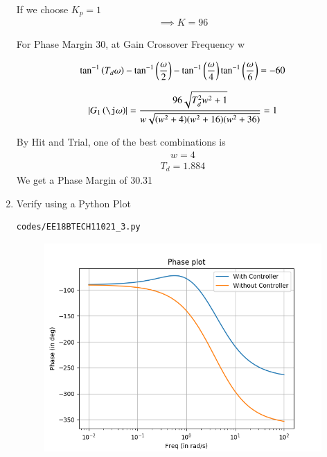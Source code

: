 \begin{enumerate}[label=\thesection.\arabic*.,ref=\thesection.\theenumi]
If we choose $K_{p} = 1$
\begin{align}
    \implies K = 96
\end{align}

For Phase Margin 30\degree, at Gain Crossover Frequency w

\begin{align}
    \tan^{-1}\left(T_{d}\omega\right) - \tan^{-1}\left(\frac{\omega}{2}\right) - \tan^{-1}\left(\frac{\omega}{4}\right)
    \tan^{-1}\left(\frac{\omega}{6}\right) = -60
\end{align}

\begin{align}
    \abs{G_{1}\brak{\j\omega}} = \frac{96\sqrt{T_{d}^2w^2 + 1}}{w\sqrt{(w^2+4)(w^2 + 16)(w^2 + 36)}} = 1
\end{align}

By Hit and Trial, one of the best combinations is
\begin{align}
    w = 4
\end{align}
\begin{align}
    T_{d} = 1.884
\end{align}
We get a Phase Margin of 30.31\degree

\item
Verify using a Python Plot

\solution
\begin{lstlisting}
codes/EE18BTECH11021_3.py
\end{lstlisting}

\begin{figure}
\centering
\includegraphics[width=\columnwidth]{figs/EE18BTECH11021_PD.png}
\end{figure}


\end{enumerate}
